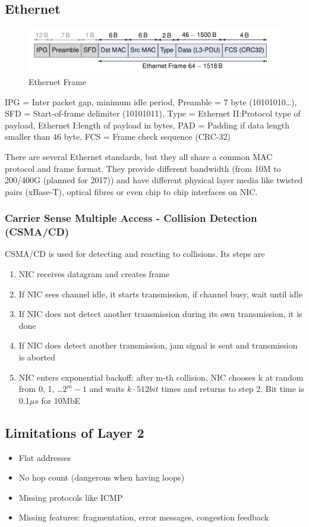 \subsection{Ethernet}
\begin{figure}[H]
  \centering
  \includegraphics[width=.8\textwidth]{figures/ethernet_frame.png}
  \caption{Ethernet Frame}\label{fig:ethernet_frame}
\end{figure}
IPG = Inter packet gap, minimum idle period,
Preamble = 7 byte (10101010\dots),
SFD = Start-of-frame delimiter (10101011),
Type = Ethernet II:\@ Protocol type of payload, Ethernet I:\@ length of payload in bytes,
PAD = Padding if data length smaller than 46 byte,
FCS = Frame check sequence (CRC-32)

There are several Ethernet standards, but they all share a common MAC protocol and frame format.
They provide different bandwidth (from 10M to 200/400G (planned for 2017)) and have different physical layer media like twisted pairs (xBase-T), optical fibres or even chip to chip interfaces on NIC.

\subsubsection{Carrier Sense Multiple Access - Collision Detection (CSMA/CD)}
CSMA/CD is used for detecting and reacting to collisions.
Its steps are
\begin{enumerate}
  \item NIC receives datagram and creates frame
  \item If NIC sees channel idle, it starts transmission, if channel busy, wait until idle
  \item If NIC does not detect another transmission during its own transmission, it is done
  \item If NIC does detect another transmission, jam signal is sent and transmission is aborted
  \item NIC enters exponential backoff: after m-th collision, NIC chooses k at random from 0, 1, \dots $2^m - 1$ and waits $k \cdot 512bit$ times and returns to step 2.
    Bit time is 0.1$\mu s$ for 10MbE
\end{enumerate}

\subsection{Limitations of Layer 2}
\begin{itemize}
  \item Flat addresses
  \item No hop count (dangerous when having loops)
  \item Missing protocols like ICMP
  \item Missing features: fragmentation, error messages, congestion feedback
\end{itemize}

